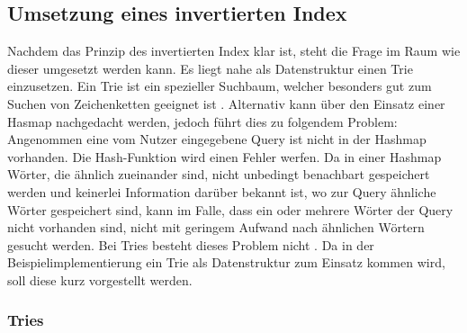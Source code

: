 \subsection{Umsetzung eines invertierten Index}
Nachdem das Prinzip des invertierten Index klar ist, steht die Frage im Raum wie dieser umgesetzt werden kann.
Es liegt nahe als Datenstruktur einen Trie einzusetzen. Ein Trie ist ein spezieller Suchbaum, welcher besonders gut zum Suchen von Zeichenketten geeignet ist \cite{IR_Intro_Cambridge}.
\newline
Alternativ kann über den Einsatz einer Hasmap nachgedacht werden, jedoch führt dies zu folgendem Problem:
Angenommen eine vom Nutzer eingegebene Query ist nicht in der Hashmap vorhanden. Die Hash-Funktion wird einen Fehler werfen. Da in einer Hashmap Wörter, die ähnlich zueinander sind, nicht unbedingt benachbart gespeichert werden und keinerlei Information darüber bekannt ist, wo zur Query ähnliche Wörter gespeichert sind, kann im Falle, dass ein oder mehrere Wörter der Query nicht vorhanden sind, nicht mit geringem Aufwand nach ähnlichen Wörtern gesucht werden. Bei Tries besteht dieses Problem nicht \cite{IR_Intro_Cambridge}. 
\newline
Da in der Beispielimplementierung ein Trie als Datenstruktur zum Einsatz kommen wird, soll diese kurz vorgestellt werden.

\subsubsection{Tries}
